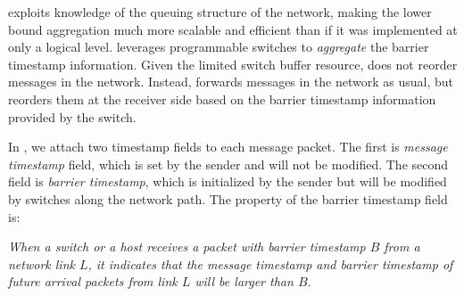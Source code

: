 
 \sys exploits knowledge of the queuing structure of the network, making the lower bound aggregation much more scalable and efficient than if it was implemented at only a logical level.
\sys leverages programmable switches to \emph{aggregate} the barrier timestamp information. Given the limited switch buffer resource, \sys does not reorder messages in the network. Instead, \sys forwards messages in the network as usual, but reorders them at the receiver side based on the barrier timestamp information provided by the switch.

In \sys, we attach two timestamp fields to each message packet. The first is \textit{message timestamp} field, which is set by the sender and will not be modified. The second field is \textit{barrier timestamp}, which is initialized by the sender but will be modified by switches along the network path. The property of the barrier timestamp field is:

\emph{When a switch or a host receives a packet with barrier timestamp $B$ from a network link $L$, it indicates that the message timestamp and barrier timestamp of future arrival packets from link $L$ will be larger than $B$.}

